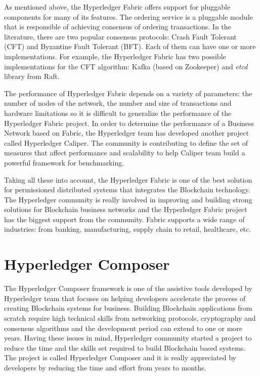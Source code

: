 As mentioned above, the Hyperledger Fabric offers support for pluggable components for many of its features. The ordering service is a pluggable module that is responsible of achieving consensus of ordering transactions. In the literature, there are two popular consensus protocols: Crash Fault Tolerant (CFT) and Byzantine Fault Tolerant (BFT). Each of them can have one or more implementations.
For example, the Hyperledger Fabric has two possible implementations for the CFT algorithm: Kafka (based on Zookeeper) and \emph{etcd} library from Raft.

The performance of Hyperledger Fabric depends on a variety of parameters: the number of nodes of the network, the number and size of transactions and hardware limitations so it is difficult to generalize the performance of the Hyperledger Fabric project. 
In order to determine the performance of a Business Network based on Fabric, the Hyperledger team has developed another project called Hyperledger Caliper. The community is contributing to define the set of measures that affect performance and scalability to help Caliper team build a powerful framework for benchmarking. 

Taking all these into account, the Hyperledger Fabric is one of the best solution for permissioned distributed systems that integrates the Blockchain technology.
The Hyperledger community is really involved in improving and building strong solutions for Blockchain business networks and the Hyperledger Fabric project has the biggest support from the community. Fabric supports a wide range of industries: from banking, manufacturing, supply chain to retail, healthcare, etc.

\section{Hyperledger Composer}
\label{sub-sec:chapter1-section3}
The Hyperledger Composer framework is one of the assistive tools developed by Hyperledger team that focuses on helping developers accelerate the process of creating Blockchain systems for business.
Building Blockchain applications from scratch require high technical skills from networking protocols, cryptography and consensus algorithms and the development period can extend to one or more years. Having these issues in mind, Hyperledger community started a project to reduce the time and the skills set required to build Blockchain based systems. The project is called Hyperledger Composer and it is really appreciated by developers by reducing the time and effort from years to months.

